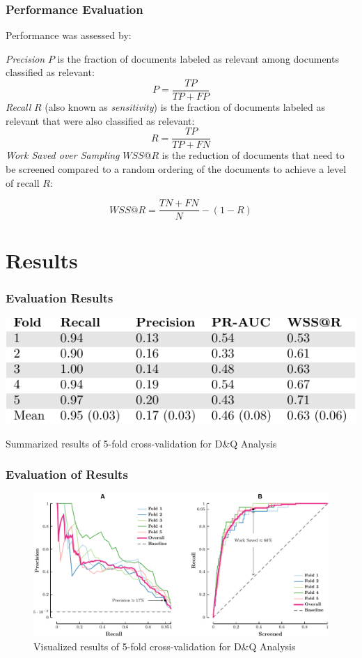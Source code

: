 \documentclass[10pt, xcolor={dvipsnames}]{beamer}
\begin{document}
\begin{frame}
\frametitle{Performance Evaluation}
Performance was assessed by:
\begin{definition}
{\it Precision} $P$ is the fraction of documents labeled as relevant among documents classified as relevant:
$$
P = \frac{TP}{TP + FP}
$$
{\it Recall} $R$ (also known as {\it sensitivity}) is the fraction of documents labeled as relevant that were also classified as relevant:
$$
R = \frac{TP}{TP + FN}
$$
{\it Work Saved over Sampling} $WSS@R$ is the reduction of documents that need to be screened compared to a random ordering of the documents to achieve a level of recall $R$:

$$
WSS@R = \frac{TN + FN}{N} - (1 - R)
$$
\end{definition}
\end{frame}

\section{Results}
\begin{frame}
\frametitle{Evaluation Results}
\begin{table}
\centering
\includegraphics[width=.8\textwidth]{../report/tables/evaluation-results/evaluation-results-crop.pdf}
\caption{Summarized results of 5-fold cross-validation for D\&Q Analysis}
\end{table}
\end{frame}

\begin{frame}
\frametitle{Evaluation of Results}
\begin{figure}
\centering
\includegraphics[width=1\textwidth]{../report/figures/performance-evaluation/combined/performance-evaluation-crop.pdf}
\caption{Visualized results of 5-fold cross-validation for D\&Q Analysis}
\end{figure}
\end{frame}
\end{document}
